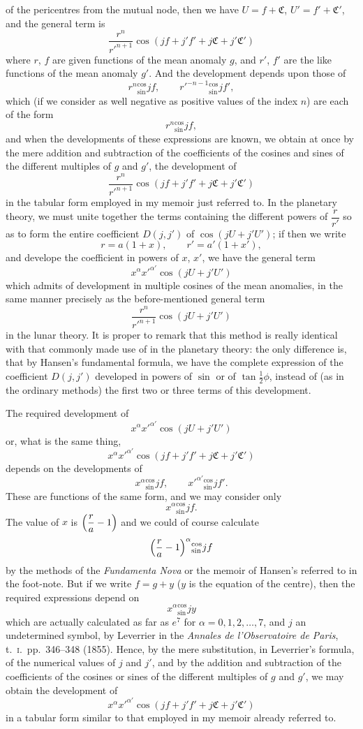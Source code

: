 \documentclass[12pt,a4paper]{article}
\theoremstyle{plain}
\begin{document}
\newpage
{} of the pericentres from the mutual node, then we have $U=f+\mathfrak{C}$, $U'=f'+\mathfrak{C}'$, and the general term is
\[
\frac{r^{n}}{r'^{n+1}}\cos(jf+j'f'+j\mathfrak{C}+j'\mathfrak{C}')
\]
where $r$, $f$ are given functions of the mean anomaly $g$, and $r'$, $f'$ are the like functions of the mean anomaly $g'$. And the development depends upon those of
\[
r^{n}{}^{\cos}_{\sin}jf,\qquad r'^{-n-1}{}^{\cos}_{\sin}jf',
\]
which (if we consider as well negative as positive values of the index $n$) are each of the form
\[
r^{n}{}^{\cos}_{\sin}jf,
\]
and when the developments of these expressions are known, we obtain at once by the mere addition and subtraction of the coefficients of the cosines and sines of the different multiples of $g$ and $g'$, the development of
\[
\frac{r^{n}}{r'^{n+1}}\cos(jf+j'f'+j\mathfrak{C}+j'\mathfrak{C}')
\]
in the tabular form employed in my memoir just referred to. In the planetary theory, we must unite together the terms containing the different powers of $\dfrac{r}{r'}$ so as to form the entire coefficient $D(j,j')$ of $\cos(jU+j'U')$; if then we write
\[
r=a(1+x),\qquad r'=a'(1+x'),
\]
and develope the coefficient in powers of $x$, $x'$, we have the general term
\[
x^{\alpha}x'^{\alpha'}\cos(jU+j'U')
\]
which admits of development in multiple cosines of the mean anomalies, in the same manner precisely as the before-mentioned general term
\[
\frac{r^{n}}{r'^{n+1}}\cos(jU+j'U')
\]
in the lunar theory. It is proper to remark that this method is really identical with that commonly made use of in the planetary theory: the only difference is, that by Hansen's fundamental formula, we have the complete expression of the coefficient $D(j,j')$ developed in powers of $\sin$ or of $\tan\tfrac{1}{2}\phi$, instead of (as in the ordinary methods) the first two or three terms of this development.

\newpage
{} The required development of
\[
x^{\alpha}x'^{\alpha'}\cos(jU+j'U')
\]
or, what is the same thing,
\[
x^{\alpha}x'^{\alpha'}\cos(jf+j'f'+j\mathfrak{C}+j'\mathfrak{C}')
\]
depends on the developments of
\[
x^{\alpha}{}^{\cos}_{\sin}jf,\qquad x'^{\alpha'}{}^{\cos}_{\sin}jf'.
\]
These are functions of the same form, and we may consider only
\[
x^{\alpha}{}^{\cos}_{\sin}jf.
\]
The value of $x$ is $\Bigl(\dfrac{r}{a}-1\Bigr)$ and we could of course calculate
\[
\Bigl(\dfrac{r}{a}-1\Bigr)^{\alpha}{}^{\cos}_{\sin}jf
\]
by the methods of the \textit{Fundamenta Nova} or the memoir of Hansen's referred to in the foot-note. But if we write $f=g+y$ ($y$ is the equation of the centre), then the required expressions depend on
\[
x^{\alpha}{}^{\cos}_{\sin}jy
\]
which are actually calculated as far as $e^{7}$ for $\alpha=0,1,2,\ldots,7$, and $j$ an undetermined symbol, by Leverrier in the \textit{Annales de l'Observatoire de Paris}, t.~\textsc{i}.\ pp.~346--348 (1855). Hence, by the mere substitution, in Leverrier's formula, of the numerical values of $j$ and $j'$, and by the addition and subtraction of the coefficients of the cosines or sines of the different multiples of $g$ and $g'$, we may obtain the development of
\[
x^{\alpha}x'^{\alpha'}\cos(jf+j'f'+j\mathfrak{C}+j'\mathfrak{C}')
\]
in a tabular form similar to that employed in my memoir already referred to.
\end{document}
